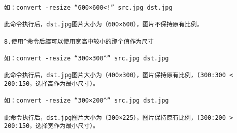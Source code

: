\begin{verbatim}
如：convert -resize “600×600<!” src.jpg dst.jpg

此命令执行后，dst.jpg图片大小为（600×600），图片不保持原有比例。

8.使用^命令后缀可以使用宽高中较小的那个值作为尺寸

如：convert -resize “300×300^” src.jpg dst.jpg

此命令执行后，dst.jpg图片大小为（400×300），图片保持原有比例，(300:300 < 200:150，选择高作为最小尺寸）。

如：convert -resize “300×200^” src.jpg dst.jpg

此命令执行后，dst.jpg图片大小为（300×225），图片保持原有比例，(300:200 > 200:150，选择宽作为最小尺寸）。


\end{verbatim}

